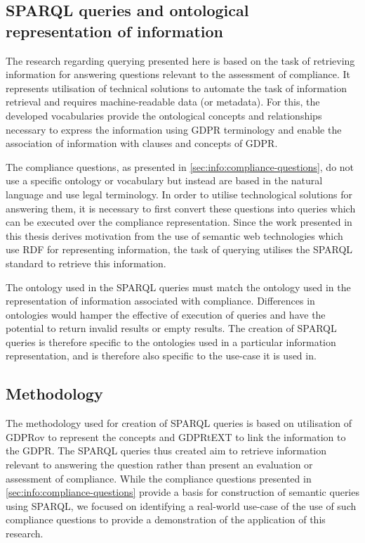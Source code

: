 \subsection{SPARQL queries and ontological representation of information}\label{sec:testing:sparql:relation}
The research regarding querying presented here is based on the task of retrieving information for answering questions relevant to the assessment of compliance.
It represents utilisation of technical solutions to automate the task of information retrieval and requires machine-readable data (or metadata).
For this, the developed vocabularies provide the ontological concepts and relationships necessary to express the information using GDPR terminology and enable the association of information with clauses and concepts of GDPR.

The compliance questions, as presented in \autoref{sec:info:compliance-questions}, do not use a specific ontology or vocabulary but instead are based in the natural language and use legal terminology. In order to utilise technological solutions for answering them, it is necessary to first convert these questions into queries which can be executed over the compliance representation.
Since the work presented in this thesis derives motivation from the use of semantic web technologies which use RDF for representing information, the task of querying utilises the SPARQL standard to retrieve this information.

The ontology used in the SPARQL queries must match the ontology used in the representation of information associated with compliance. Differences in ontologies would hamper the effective of execution of queries and have the potential to return invalid results or empty results.
The creation of SPARQL queries is therefore specific to the ontologies used in a particular information representation, and is therefore also specific to the use-case it is used in.

\subsection{Methodology}\label{sec:testing:sparql:methodology}
The methodology used for creation of SPARQL queries is based on utilisation of GDPRov to represent the concepts and GDPRtEXT to link the information to the GDPR.
The SPARQL queries thus created aim to retrieve information relevant to answering the question rather than present an evaluation or assessment of compliance.
While the compliance questions presented in \autoref{sec:info:compliance-questions} provide a basis for construction of semantic queries using SPARQL, we focused on identifying a real-world use-case of the use of such compliance questions to provide a demonstration of the application of this research.

